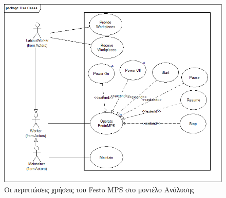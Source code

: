 \documentclass[a4paper,12pt,twoside]{report}
\begin{document}
\begin{appendices}
			\clearpage
			\begin{figure}[hp]
					\centering
					\includegraphics[scale=0.30]{AnalysisModel_uc-TopLevelUseCases.png}
					\caption{Οι περιπτώσεις χρήσεις του Festo MPS στο μοντέλο Ανάλυσης}
					\label{φωτ:Οι περιπτώσεις χρήσεις του Festo MPS στο μοντέλο Ανάλυσης}
			\end{figure}
			

\end{appendices}
\end{document}
